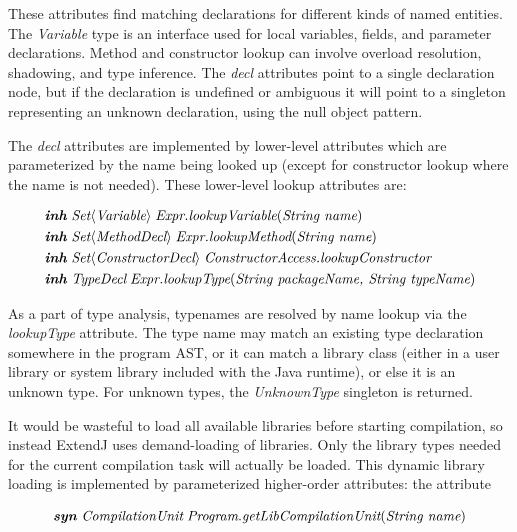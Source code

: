 \documentclass[10pt, twoside, openright]{book}
\begin{document}
\noindent
These attributes find matching declarations for different kinds of named entities.
The \emph{Variable} type is an interface used for local variables, fields, and
parameter declarations. Method and constructor lookup can involve overload resolution,
shadowing, and type inference. The \emph{decl} attributes point to a single declaration
node, but if the declaration is undefined or ambiguous it will point to a singleton
representing an unknown declaration, using the null object pattern.

The \emph{decl} attributes are implemented by lower-level attributes which are parameterized
by the name being looked up (except for constructor lookup where the name is not needed).
These lower-level lookup attributes are:

\begin{align*}
& \textbf{\textit{inh}} \; \textit{Set}\langle\textit{Variable}\rangle \; \textit{Expr.lookupVariable}(\textit{String name}) \\
& \textbf{\textit{inh}} \; \textit{Set}\langle\textit{MethodDecl}\rangle \; \textit{Expr.lookupMethod}(\textit{String name}) \\
& \textbf{\textit{inh}} \; \textit{Set}\langle\textit{ConstructorDecl}\rangle \; \textit{ConstructorAccess.lookupConstructor} \\
& \textbf{\textit{inh}} \; \textit{TypeDecl} \; \textit{Expr.lookupType}(\textit{String packageName, String typeName})
\end{align*}

As a part of type analysis, typenames are resolved by name lookup via the \emph{lookupType} attribute.
The type name may
match an existing type declaration somewhere in the program AST, or it can match
a library class (either in a user library or system library included with the Java runtime),
or else it is an unknown type. For unknown types, the \emph{UnknownType} singleton is returned.

It would be wasteful to load all available libraries before starting compilation,
so instead ExtendJ uses demand-loading of libraries. Only the library types needed for the current
compilation task will actually be loaded. This dynamic library loading is implemented by
parameterized higher-order attributes: the attribute

\begin{equation*}
\textbf{\textit{syn}} \; \textit{CompilationUnit} \; \textit{Program}.\textit{getLibCompilationUnit}(\textit{String name})
\end{equation*}
\end{document}
